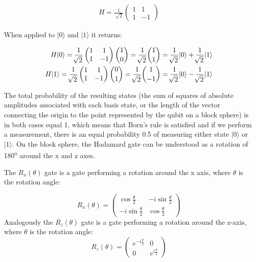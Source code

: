 \documentclass[twoside,twocolumn,9pt]{article}
\begin{document}
\begin{align}
  H=\frac{1}{\sqrt[]{2}}\begin{pmatrix}
    1 & 1 \\
    1 & -1
  \end{pmatrix}
\end{align}

When applied to $|0\rangle$ and $|1\rangle$ it returns:

\begin{equation}
  \begin{split}
  H|0\rangle=\frac{1}{\sqrt[]{2}}\begin{pmatrix}
    1 & 1 \\
    1 & -1
  \end{pmatrix}\dbinom{1}{0}=\frac{1}{\sqrt[]{2}}\dbinom{1}{1}=\frac{1}{\sqrt[]{2}}|0\rangle+\frac{1}{\sqrt[]{2}}|1\rangle
  \\
  H|1\rangle=\frac{1}{\sqrt[]{2}}\begin{pmatrix}
    1 & 1 \\
    1 & -1
  \end{pmatrix}\dbinom{0}{1}=\frac{1}{\sqrt[]{2}}\dbinom{1}{-1}=\frac{1}{\sqrt[]{2}}|0\rangle-\frac{1}{\sqrt[]{2}}|1\rangle
  \end{split}
  \end{equation}

The total probability of the resulting states (the sum of squares of absolute amplitudes associated with each basis state, or the length of the vector connecting the origin to the point represented by the qubit on a block sphere) is in both cases equal 1, which means that Born's rule is satisfied and if we perform a measurement, there is an equal probability 0.5 of measuring either state $|0\rangle$ or $|1\rangle$. On the block sphere, the Hadamard gate can be understood as a rotation of 180\textsuperscript{o} around the x and z axes.


The $R_x(\theta)$ gate is a gate performing a rotation around the x axis, where $\theta$ is the rotation angle:

\begin{equation}
  R_x(\theta) = \begin{pmatrix}
  \cos\frac{\theta}{2} & -i\sin\frac{\theta}{2} \\
  -i\sin\frac{\theta}{2} & \cos\frac{\theta}{2}
  \end{pmatrix}
\end{equation}
Analogously the $R_z(\theta)$ gate is a gate performing a rotation around the z-axis, where $\theta$ is the rotation angle:
\begin{equation}
  R_z(\theta) = \begin{pmatrix}
  e^{-i\frac{\theta}{2}} & 0 \\
  0 & e^{i\frac{\theta}{2}}
  \end{pmatrix}
\end{equation}
\end{document}
